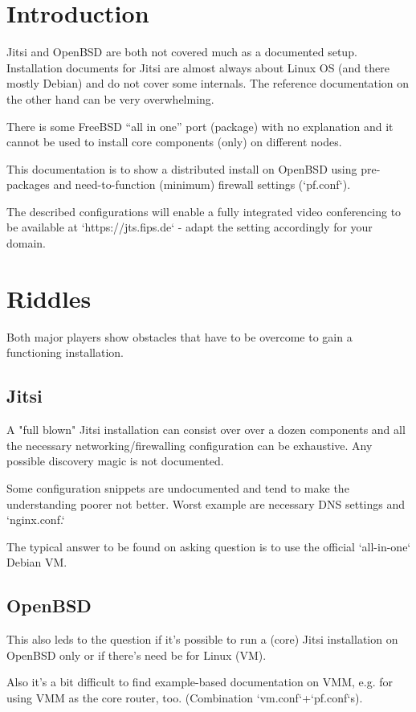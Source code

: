 \documentclass[conference]{IEEEtran}
\begin{document}
\section{Introduction}
Jitsi and OpenBSD are both not covered much as a documented setup. Installation documents
for Jitsi are almost always about Linux OS (and there mostly Debian) and do not cover
some internals. The reference documentation on the other hand can be very overwhelming.

There is some FreeBSD ``all in one'' port (package) with no explanation and it cannot be
used to install core components (only) on different nodes.

This documentation is to show a distributed install on OpenBSD using pre-packages and
need-to-function (minimum) firewall settings (`pf.conf`).

The described configurations will enable a fully integrated video conferencing
to be available at `https://jts.fips.de` - adapt the setting accordingly for your domain.

\section{Riddles}
Both major players show obstacles that have to be overcome to gain a functioning installation.
\subsection{Jitsi}
A "full blown" Jitsi installation can consist over over a dozen components and all the
necessary networking/firewalling configuration can be exhaustive. Any possible discovery
magic is not documented.

Some configuration snippets are undocumented and tend to make the understanding poorer
not better. Worst example are necessary DNS settings and `nginx.conf.`

The typical answer to be found on asking question is to use the official `all-in-one`
Debian VM.

\subsection{OpenBSD}
This also leds to the question if it's possible to run a (core) Jitsi installation on
OpenBSD only or if there's need be for Linux (VM).

Also it's a bit difficult to find example-based documentation on VMM, e.g. for using
VMM as the core router, too. (Combination `vm.conf`+`pf.conf`s).
\end{document}
